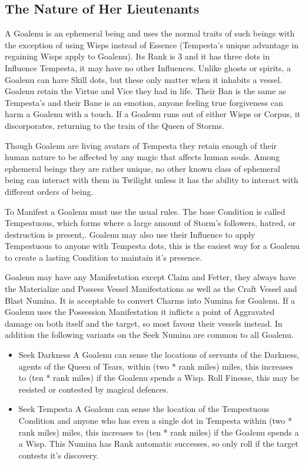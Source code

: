 \subsection*{The Nature of Her Lieutenants}

A Goalenu is an ephemeral being and uses the normal traits of such beings with the exception of using Wisps instead of Essence (Tempesta's unique advantage in regaining Wisps apply to Goalenu). Its Rank is 3 and it has three dots in Influence Tempesta, it may have no other Influences. Unlike ghosts or spirits, a Goalenu can have Skill dots, but these only matter when it inhabits a vessel. Goalenu retain the Virtue and Vice they had in life. Their Ban is the same as Tempesta's and their Bane is an emotion, anyone feeling true forgiveness can harm a Goalenu with a touch. If a Goalenu runs out of either Wisps or Corpus, it discorporates, returning to the train of the Queen of Storms. 

Though Goalenu are living avatars of Tempesta they retain enough of their human nature to be affected by any magic that affects human souls. Among ephemeral beings they are rather unique, no other known class of ephemeral being can interact with them in Twilight unless it has the ability to interact with different orders of being. 

To Manifest a Goalenu must use the usual rules. The base Condition is called Tempestuous, which forms where a large amount of Storm's followers, hatred, or destruction is present,. Goalenu may also use their Influence to apply Tempestuous to anyone with Tempesta dots, this is the easiest way for a Goalenu to create a lasting Condition to maintain it's presence. 

Goalenu may have any Manifestation except Claim and Fetter, they always have the Materialize and Possess Vessel Manifestations as well as the Craft Vessel and Blast Numina. It is acceptable to convert Charms into Numina for Goalenu. If a Goalenu uses the Possession Manifestation it inflicts a point of Aggravated damage on both itself and the target, so most favour their vessels instead. In addition the following variants on the Seek Numina are common to all Goalenu.

   \begin{itemize}
    \item  Seek Darkness \textendash A Goalenu can sense the locations of servants of the Darkness, agents of the Queen of Tears, within (two * rank miles) miles, this increases to (ten * rank miles) if the Goalenu spends a Wisp. Roll Finesse, this may be resisted or contested by magical defences. 
    
    \item Seek Tempesta \textendash A Goalenu can sense the location of the Tempestuous Condition and anyone who has even a single dot in Tempesta within (two * rank miles) miles, this increases to (ten * rank miles) if the Goalenu spends a a Wisp. This Numina has Rank automatic successes, so only roll if the target contests it's discovery. \end{itemize}

